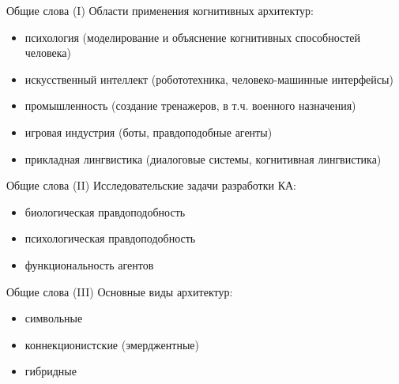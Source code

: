 \documentclass{beamer}
\begin{document}
\begin{frame}{Общие слова (I)}
Области применения когнитивных архитектур:\\
\medskip
\begin{itemize}
	\item психология (моделирование и объяснение когнитивных способностей человека)
	\medskip
	\item искусственный интеллект (робототехника, человеко-машинные интерфейсы)
	\medskip
	\item промышленность (создание тренажеров, в т.ч. военного назначения)
	\medskip 
	\item игровая индустрия (боты, правдоподобные агенты)
	\medskip
	\item прикладная лингвистика (диалоговые системы, когнитивная лингвистика)
\end{itemize}
\end{frame}

\begin{frame}{Общие слова (II)}
Исследовательские задачи разработки КА:\\
\medskip
\begin{itemize}
	\item биологическая правдоподобность
	\medskip
	\item психологическая правдоподобность
	\medskip
	\item функциональность агентов
\end{itemize}
\end{frame}

\begin{frame}{Общие слова (III)}
Основные виды архитектур:\\
\medskip
\begin{itemize}
	\item символьные
	\medskip
	\item коннекционистские (эмерджентные)
	\medskip
	\item гибридные
\end{itemize}
\end{frame}


\iffalse
\end{document}
